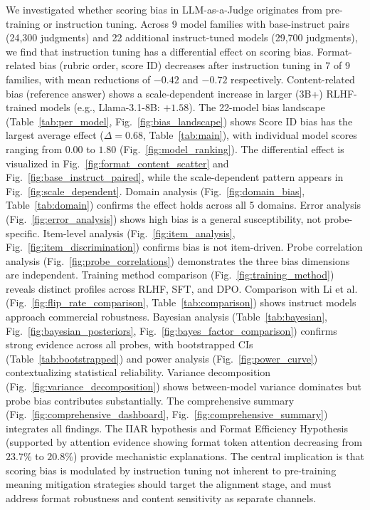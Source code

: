 \documentclass[11pt,twocolumn]{article}
\begin{document}
We investigated whether scoring bias in LLM-as-a-Judge originates from pre-training or instruction tuning. Across 9 model families with base-instruct pairs (24,300 judgments) and 22 additional instruct-tuned models (29,700 judgments), we find that instruction tuning has a differential effect on scoring bias. Format-related bias (rubric order, score ID) decreases after instruction tuning in 7 of 9 families, with mean reductions of $-0.42$ and $-0.72$ respectively. Content-related bias (reference answer) shows a scale-dependent increase in larger (3B+) RLHF-trained models (e.g., Llama-3.1-8B: $+1.58$). The 22-model bias landscape (Table~\ref{tab:per_model}, Fig.~\ref{fig:bias_landscape}) shows Score ID bias has the largest average effect ($\Delta=0.68$, Table~\ref{tab:main}), with individual model scores ranging from $0.00$ to $1.80$ (Fig.~\ref{fig:model_ranking}). The differential effect is visualized in Fig.~\ref{fig:format_content_scatter} and Fig.~\ref{fig:base_instruct_paired}, while the scale-dependent pattern appears in Fig.~\ref{fig:scale_dependent}. Domain analysis (Fig.~\ref{fig:domain_bias}, Table~\ref{tab:domain}) confirms the effect holds across all 5 domains. Error analysis (Fig.~\ref{fig:error_analysis}) shows high bias is a general susceptibility, not probe-specific. Item-level analysis (Fig.~\ref{fig:item_analysis}, Fig.~\ref{fig:item_discrimination}) confirms bias is not item-driven. Probe correlation analysis (Fig.~\ref{fig:probe_correlations}) demonstrates the three bias dimensions are independent. Training method comparison (Fig.~\ref{fig:training_method}) reveals distinct profiles across RLHF, SFT, and DPO. Comparison with Li et al. (Fig.~\ref{fig:flip_rate_comparison}, Table~\ref{tab:comparison}) shows instruct models approach commercial robustness. Bayesian analysis (Table~\ref{tab:bayesian}, Fig.~\ref{fig:bayesian_posteriors}, Fig.~\ref{fig:bayes_factor_comparison}) confirms strong evidence across all probes, with bootstrapped CIs (Table~\ref{tab:bootstrapped}) and power analysis (Fig.~\ref{fig:power_curve}) contextualizing statistical reliability. Variance decomposition (Fig.~\ref{fig:variance_decomposition}) shows between-model variance dominates but probe bias contributes substantially. The comprehensive summary (Fig.~\ref{fig:comprehensive_dashboard}, Fig.~\ref{fig:comprehensive_summary}) integrates all findings. The IIAR hypothesis and Format Efficiency Hypothesis (supported by attention evidence showing format token attention decreasing from $23.7\%$ to $20.8\%$) provide mechanistic explanations. The central implication is that scoring bias is modulated by instruction tuning not inherent to pre-training meaning mitigation strategies should target the alignment stage, and must address format robustness and content sensitivity as separate channels.
\end{document}
